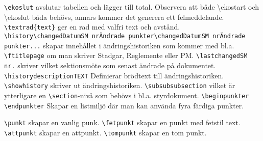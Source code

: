 \documentclass{fstildok}
\newcommand{\bs}{\textbackslash}
\begin{document}
\begin{punkter}
\punkt \texttt{\bs ekoslut} avslutar tabellen och lägger till total. Observera att både \bs ekostart och \bs ekoslut båda behövs, annars kommer det generera ett felmeddelande.
\punkt \texttt{\bs textrad\{text\}} ger en rad med valfri text och avstånd.
\punkt \texttt{\bs history{\bs changed{Datum}{SM nr}{Ändrade punkter}}\bs changed{Datum}{SM nr}{Ändrade punkter}...} skapar innehållet i ändringshistoriken som kommer med bl.a. \texttt{\bs ftitlepage} om man skriver Stadgar, Reglemente eller PM.
\punkt \texttt{\bs lastchanged{SM nr.}} skriver vilket sektionsmöte som senast ändrade på dokumentet.
\punkt \texttt{\bs historydescription{TEXT}} Definierar brödtext till ändringshistoriken.
\punkt \texttt{\bs showhistory} skriver ut ändringshistoriken.
\punkt \texttt{\bs subsubsubsection} vilket är ytterligare en \texttt{\bs section}-nivå som behövs i bl.a. styrdokument.
\punkt \texttt{\bs begin{punkter} \bs end{punkter}} Skapar en listmiljö där man kan använda fyra färdiga punkter.
\begin{punkter}
\punkt \texttt{\bs punkt} skapar en vanlig punk.
\fetpunkt \texttt{\bs fetpunkt} skapar en punkt med fetstil text.
\attpunkt \texttt{\bs attpunkt} skapar en attpunkt.
\tompunkt \texttt{\bs tompunkt} skapar en tom punkt.
\end{punkter}
\end{punkter}
\end{document}
